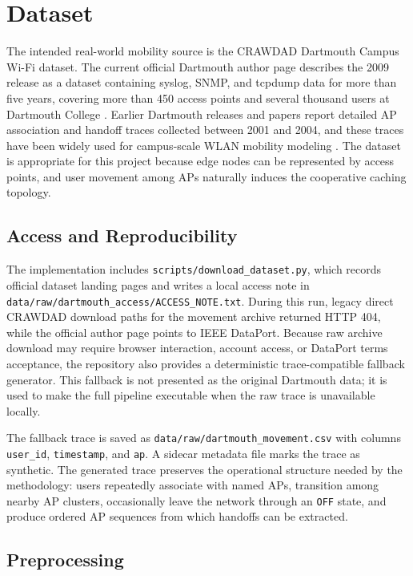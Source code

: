 \section{Dataset}

The intended real-world mobility source is the CRAWDAD Dartmouth Campus Wi-Fi dataset. The current official Dartmouth author page describes the 2009 release as a dataset containing syslog, SNMP, and tcpdump data for more than five years, covering more than 450 access points and several thousand users at Dartmouth College \cite{kotz_dartmouth_campus_2009}. Earlier Dartmouth releases and papers report detailed AP association and handoff traces collected between 2001 and 2004, and these traces have been widely used for campus-scale WLAN mobility modeling \cite{Kotz2004Dartmouth,kim2005mobility_wifi_ap}. The dataset is appropriate for this project because edge nodes can be represented by access points, and user movement among APs naturally induces the cooperative caching topology.

\subsection{Access and Reproducibility}

The implementation includes \texttt{scripts/download\_dataset.py}, which records official dataset landing pages and writes a local access note in \texttt{data/raw/dartmouth\_access/ACCESS\_NOTE.txt}. During this run, legacy direct CRAWDAD download paths for the movement archive returned HTTP 404, while the official author page points to IEEE DataPort. Because raw archive download may require browser interaction, account access, or DataPort terms acceptance, the repository also provides a deterministic trace-compatible fallback generator. This fallback is not presented as the original Dartmouth data; it is used to make the full pipeline executable when the raw trace is unavailable locally.

The fallback trace is saved as \texttt{data/raw/dartmouth\_movement.csv} with columns \texttt{user\_id}, \texttt{timestamp}, and \texttt{ap}. A sidecar metadata file marks the trace as synthetic. The generated trace preserves the operational structure needed by the methodology: users repeatedly associate with named APs, transition among nearby AP clusters, occasionally leave the network through an \texttt{OFF} state, and produce ordered AP sequences from which handoffs can be extracted.

\subsection{Preprocessing}

